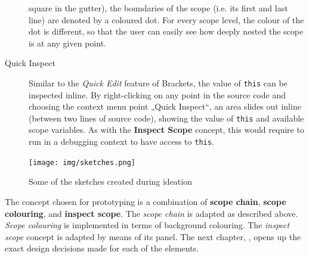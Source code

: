 \begin{description}
square in the gutter), the boundaries of the scope (i.e. its first and
last line) are denoted by a coloured dot. For every scope level, the
colour of the dot is different, so that the user can easily see how
deeply nested the scope is at any given point.
\item[Quick Inspect]
Similar to the \emph{Quick Edit} feature of Brackets, the value of
\texttt{this} can be inspected inline. By right-clicking on any point in
the source code and choosing the context menu point „Quick Inspect“, an
area slides out inline (between two lines of source code), showing the
value of \texttt{this} and available scope variables. As with the
\textbf{Inspect Scope} concept, this would require to run in a debugging
context to have access to \texttt{this}.
\end{description}

\begin{figure}[htbp]
\centering
\texttt{[image: img/sketches.png]}
\caption{Some of the sketches created during ideation}
\label{fig:sketches1}
\end{figure}

The concept chosen for prototyping is a combination of \textbf{scope
chain}, \textbf{scope colouring}, and \textbf{inspect scope}. The
\emph{scope chain} is adapted as described above. \emph{Scope colouring}
is implemented in terms of background colouring. The \emph{inspect
scope} concept is adapted by means of its panel. The next chapter,
, opens up the exact design decisions made for each of
the elements.
